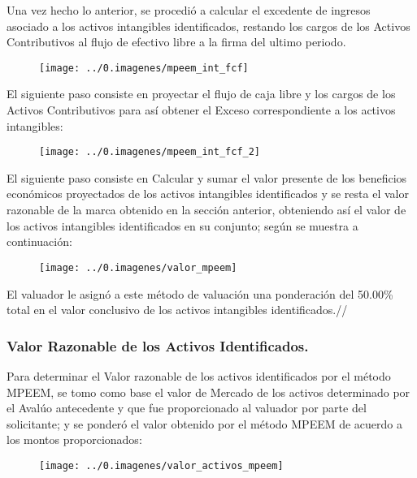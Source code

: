 Una vez hecho lo anterior, se procedió a calcular el excedente de ingresos asociado a los activos intangibles identificados, restando los cargos de los \textcolor{principal}{Activos Contributivos} al flujo de efectivo libre a la firma del ultimo periodo.\\

\begin{figure}[H]
\centering
	\texttt{[image: ../0.imagenes/mpeem\_int\_fcf]}
\end{figure}

El siguiente paso consiste en proyectar el flujo de caja libre y los cargos de los Activos Contributivos para así obtener el Exceso correspondiente a los activos intangibles:\\

\begin{figure}[H]
\centering
	\texttt{[image: ../0.imagenes/mpeem\_int\_fcf\_2]}
\end{figure}

El siguiente paso consiste en Calcular y sumar el valor presente de los beneficios económicos proyectados de los activos intangibles identificados y se resta el valor razonable de la marca \marca obtenido en la sección anterior, obteniendo así el valor de los activos intangibles identificados en su conjunto; según se muestra a continuación:

\begin{figure}[H]
\centering
	\texttt{[image: ../0.imagenes/valor\_mpeem]}
\end{figure}

El valuador le asign\'o a este m\'etodo de valuaci\'on una ponderaci\'on del 50.00\% total en el valor conclusivo de los activos intangibles identificados.//%

\subsubsection{Valor Razonable de los Activos Identificados.}

Para determinar el Valor razonable de los activos identificados por el método MPEEM, se tomo como base el valor de Mercado de los activos determinado por el Avalúo antecedente y que fue proporcionado al valuador por parte del solicitante; y se ponderó el valor obtenido por el método MPEEM de acuerdo a los montos proporcionados:

\begin{figure}[H]
\centering
	\texttt{[image: ../0.imagenes/valor\_activos\_mpeem]}
\end{figure}



